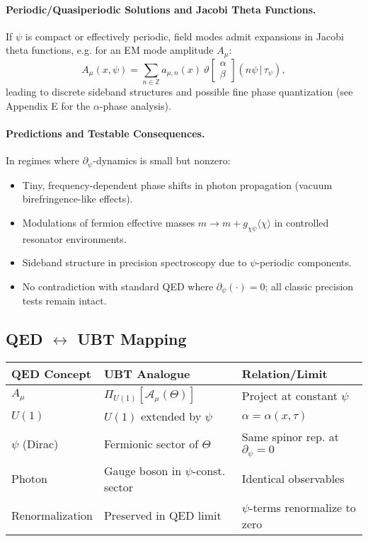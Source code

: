 \paragraph{Periodic/Quasiperiodic Solutions and Jacobi Theta Functions.} If $\psi$ is compact or effectively periodic, field modes admit expansions in Jacobi theta functions, e.g. for an EM mode amplitude $A_\mu$:
\begin{equation}
A_\mu(x,\psi) = \sum_{n\in\mathbb{Z}} a_{\mu,n}(x)\, \vartheta\!\left[\begin{array}{c} \alpha \\ \beta \end{array}\right](n\psi \,|\, \tau_\psi) ,
\end{equation}
leading to discrete sideband structures and possible fine phase quantization (see Appendix E for the $\alpha$-phase analysis).

\paragraph{Predictions and Testable Consequences.} In regimes where $\partial_\psi$-dynamics is small but nonzero:
\begin{itemize}
\item Tiny, frequency-dependent phase shifts in photon propagation (vacuum birefringence-like effects).
\item Modulations of fermion effective masses $m \to m + g_{\chi\psi}\langle \chi \rangle$ in controlled resonator environments.
\item Sideband structure in precision spectroscopy due to $\psi$-periodic components.
\item No contradiction with standard QED where $\partial_\psi(\cdot)=0$; all classic precision tests remain intact.
\end{itemize}

\subsection*{QED $\leftrightarrow$ UBT Mapping}
\begin{center}
\begin{tabular}{lll}
\hline
\textbf{QED Concept} & \textbf{UBT Analogue} & \textbf{Relation/Limit} \\
\hline
$A_\mu$ & $\Pi_{U(1)}[\mathcal{A}_\mu(\Theta)]$ & Project at constant $\psi$ \\
$U(1)$ & $U(1)$ extended by $\psi$ & $\alpha=\alpha(x,\tau)$ \\
$\psi$ (Dirac) & Fermionic sector of $\Theta$ & Same spinor rep. at $\partial_\psi=0$ \\
Photon & Gauge boson in $\psi$-const. sector & Identical observables \\
Renormalization & Preserved in QED limit & $\psi$-terms renormalize to zero \\
\hline
\end{tabular}
\end{center}

